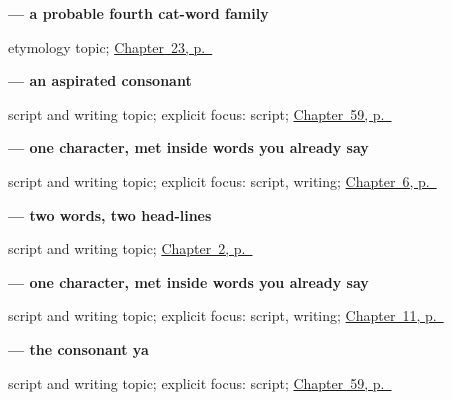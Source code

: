 \noindent\begin{minipage}[t]{\linewidth}
\raggedright
\textbf{ — a probable fourth cat-word family}\par
\footnotesize etymology topic; \hyperref[ch:hi-dog-and-cat]{Chapter~23, p.~\pageref*{ch:hi-dog-and-cat}}
\end{minipage}\par\smallskip

\noindent\begin{minipage}[t]{\linewidth}
\raggedright
\textbf{ — an aspirated consonant}\par
\footnotesize script and writing topic; explicit focus: script; \hyperref[ch:hi-script-second-wave]{Chapter~59, p.~\pageref*{ch:hi-script-second-wave}}
\end{minipage}\par\smallskip

\noindent\begin{minipage}[t]{\linewidth}
\raggedright
\textbf{ — one character, met inside words you already say}\par
\footnotesize script and writing topic; explicit focus: script, writing; \hyperref[ch:hi-numbers-1-5]{Chapter~6, p.~\pageref*{ch:hi-numbers-1-5}}
\end{minipage}\par\smallskip

\noindent\begin{minipage}[t]{\linewidth}
\raggedright
\textbf{  — two words, two head-lines}\par
\footnotesize script and writing topic; \hyperref[ch:introductions]{Chapter~2, p.~\pageref*{ch:introductions}}
\end{minipage}\par\smallskip

\noindent\begin{minipage}[t]{\linewidth}
\raggedright
\textbf{ — one character, met inside words you already say}\par
\footnotesize script and writing topic; explicit focus: script, writing; \hyperref[ch:hi-core-colours]{Chapter~11, p.~\pageref*{ch:hi-core-colours}}
\end{minipage}\par\smallskip

\noindent\begin{minipage}[t]{\linewidth}
\raggedright
\textbf{ — the consonant ya}\par
\footnotesize script and writing topic; explicit focus: script; \hyperref[ch:hi-script-second-wave]{Chapter~59, p.~\pageref*{ch:hi-script-second-wave}}
\end{minipage}\par\smallskip

